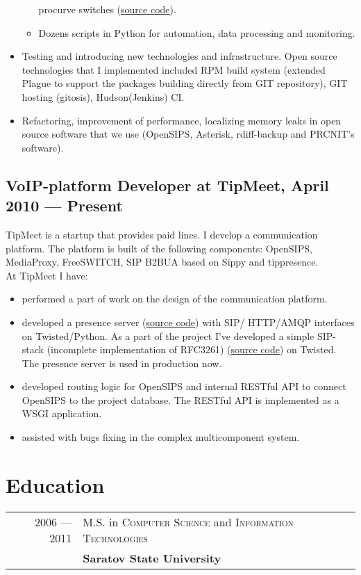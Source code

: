 \documentclass[a4paper,10pt]{article}
\begin{document}
\begin{itemize}
\begin{itemize}
procurve switches (\href{http://git.sgu.ru/?p=aaa\_hp.git;a=summary}{source
code}).
 \item Dozens scripts in Python for automation, data processing and monitoring.
 \end{itemize}
\item Testing and introducing new technologies and infrastructure. Open source
technologies that I implemented included RPM build system (extended Plague to
support the packages building directly from GIT repository), GIT hosting
(gitosis), Hudson(Jenkins) CI.
\item Refactoring, improvement of performance, localizing memory leaks in open
source software that we use (OpenSIPS, Asterisk, rdiff-backup and PRCNIT's
software).
\end{itemize}

\subsection{VoIP-platform Developer at TipMeet, April 2010 --- Present}
TipMeet is a startup that provides paid lines. I develop
a communication platform. The platform is built of the following components:
OpenSIPS, MediaProxy, FreeSWITCH, SIP B2BUA based on Sippy and
tippresence.\\
At TipMeet I have:
\begin{itemize}
\item performed a part of work on the design of the communication platform.
\item developed a presence server
(\href{http://github.com/tipmeet/tippresence}{source code}) with SIP\slash
HTTP\slash AMQP interfaces on Twisted\slash Python. As a part of the project
I've developed a simple SIP-stack (incomplete implementation of RFC3261)
(\href{http://github.com/tipmeet/tipsip}{source code}) on
Twisted. The presence server is used in production now.
\item developed routing logic for OpenSIPS and internal RESTful API
to connect OpenSIPS to the project database. The RESTful API is implemented as
a WSGI application.
\item assisted with bugs fixing in the complex multicomponent system.
\end{itemize}


\section{Education}
\begin{tabular}{rl}
2006 --- 2011& M.S. in \textsc{Computer Science} and \textsc{Information
Technologies} \\& \textbf{Saratov State University}
\end{tabular}
\end{document}
